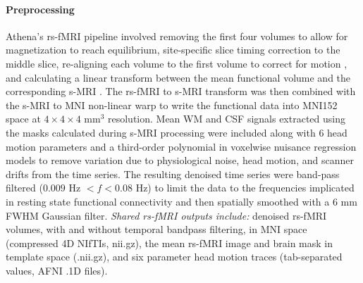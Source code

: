 \documentclass[preprint,12pt,3p]{elsarticle}
\begin{document}
\paragraph{Preprocessing}Athena's rs-fMRI pipeline involved removing the first four volumes to allow for magnetization to reach equilibrium, site-specific slice timing correction to the middle slice, re-aligning each volume to the first volume to correct for motion \cite{cox1999_motion}, and calculating a linear transform between the mean functional volume and the corresponding s-MRI \cite{jenkinson2002_flirt}. The rs-fMRI to s-MRI transform was then combined with the s-MRI to MNI non-linear warp to write the functional data into MNI152 space at $4\times4\times4$ mm$^3$ resolution. Mean WM and CSF signals extracted using the masks calculated during s-MRI processing were included along with 6 head motion parameters and a third-order polynomial in voxelwise nuisance regression models to remove variation due to physiological noise, head motion, and scanner drifts from the time series\cite{lund2006_nvr,fox2005}. The resulting denoised time series were band-pass filtered ($0.009$ Hz $< f < 0.08$ Hz) to limit the data to the frequencies implicated in resting state functional connectivity \cite{biswal1995,cordes2001} and then spatially smoothed with a 6 mm FWHM Gaussian filter. \emph{Shared rs-fMRI outputs include:} denoised rs-fMRI volumes, with and without temporal bandpass filtering, in MNI space (compressed 4D NIfTIs, nii.gz), the mean rs-fMRI image and brain mask in template space (.nii.gz), and six parameter head motion traces (tab-separated values, AFNI .1D files). 
\end{document}
